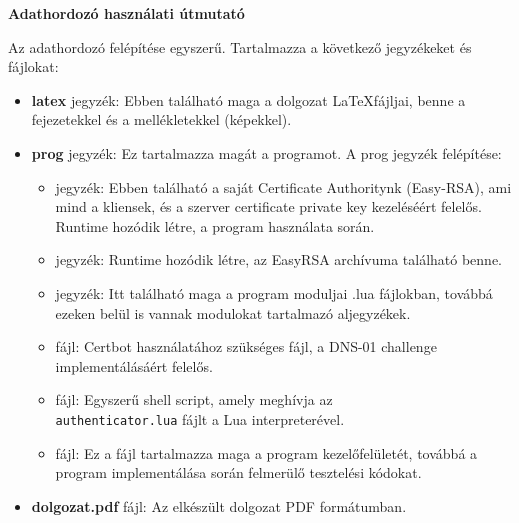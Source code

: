 \pagestyle{empty}

\noindent \textbf{\Large Adathordozó használati útmutató}

\vskip 1cm

Az adathordozó felépítése egyszerű. Tartalmazza a következő jegyzékeket és fájlokat:
\begin{itemize}
	\item \textbf{latex} jegyzék: Ebben található maga a dolgozat \LaTeX fájljai, benne a fejezetekkel és a mellékletekkel (képekkel).
	\item \textbf{prog} jegyzék: Ez tartalmazza magát a programot. A prog jegyzék felépítése:
		\begin{itemize}
			\item \textbf{} jegyzék: Ebben található a saját Certificate Authoritynk (Easy-RSA), ami mind a kliensek, és a szerver certificate \detokenize{&} private key kezeléséért felelős. Runtime hozódik létre, a program használata során.
			\item \textbf{} jegyzék: Runtime hozódik létre, az EasyRSA archívuma található benne.
			\item \textbf{} jegyzék: Itt található maga a program moduljai .lua fájlokban, továbbá ezeken belül is vannak modulokat tartalmazó aljegyzékek.
			\item \textbf{} fájl: Certbot használatához szükséges fájl, a DNS-01 challenge implementálásáért felelős.
			\item \textbf{} fájl: Egyszerű shell script, amely meghívja az \\\texttt{authenticator.lua} fájlt a Lua interpreterével.
			\item \textbf{} fájl: Ez a fájl tartalmazza maga a program kezelőfelületét, továbbá a program implementálása során felmerülő tesztelési kódokat.
		\end{itemize}
	\item \textbf{dolgozat.pdf} fájl: Az elkészült dolgozat PDF formátumban.
\end{itemize}